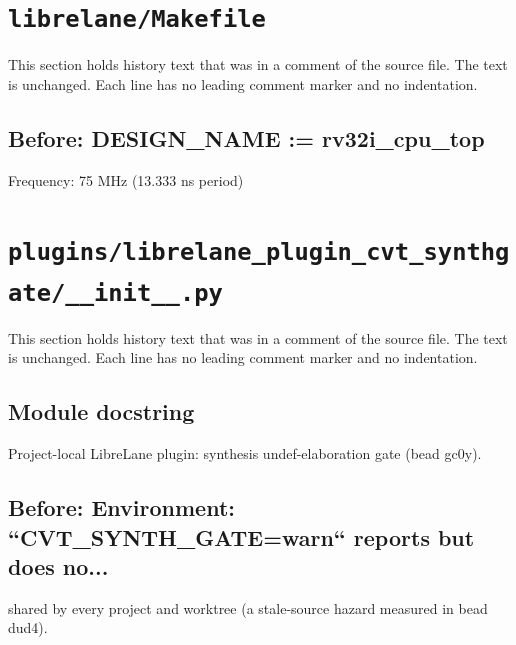 \section{\texttt{librelane/Makefile}}\label{cr:pd:librelane-makefile}

This section holds history text that was in a comment of the source file. The text is unchanged. Each line has no leading comment marker and no indentation.

\begin{record}

\subsection*{Before: DESIGN\_NAME := rv32i\_cpu\_top}

\begin{textblock}
Frequency: 75 MHz (13.333 ns period)
\end{textblock}

\end{record}

\section{\texttt{plugins/librelane\_plugin\_cvt\_synthgate/\_\_init\_\_.py}}\label{cr:pd:plugins-librelane-plugin-cvt-synthgate-init-py}

This section holds history text that was in a comment of the source file. The text is unchanged. Each line has no leading comment marker and no indentation.

\begin{record}

\subsection*{Module docstring}

\begin{textblock}
Project-local LibreLane plugin: synthesis undef-elaboration gate (bead gc0y).
\end{textblock}

\subsection*{Before: Environment: ``CVT\_SYNTH\_GATE=warn`` reports but does no...}

\begin{textblock}
shared by every project and worktree (a stale-source hazard measured in bead dud4).
\end{textblock}

\end{record}

